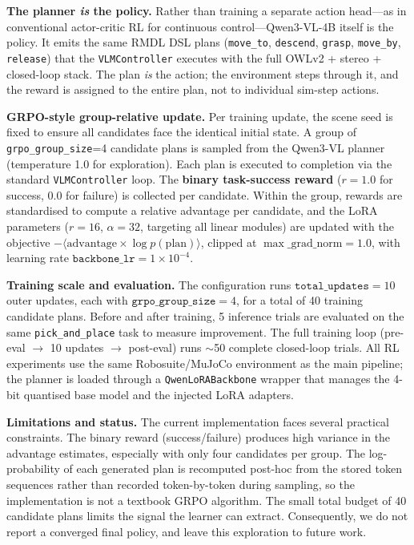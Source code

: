 \documentclass[conference]{IEEEtran}
\begin{document}
\textbf{The planner \emph{is} the policy.} Rather than training a separate action head---as in conventional actor-critic RL for continuous control---Qwen3-VL-4B itself is the policy. It emits the same RMDL DSL plans (\texttt{move\_to}, \texttt{descend}, \texttt{grasp}, \texttt{move\_by}, \texttt{release}) that the \texttt{VLMController} executes with the full OWLv2 + stereo + closed-loop stack. The plan \emph{is} the action; the environment steps through it, and the reward is assigned to the entire plan, not to individual sim-step actions.

\textbf{GRPO-style group-relative update.} Per training update, the scene seed is fixed to ensure all candidates face the identical initial state. A group of \texttt{grpo\_group\_size}=4 candidate plans is sampled from the Qwen3-VL planner (temperature 1.0 for exploration). Each plan is executed to completion via the standard \texttt{VLMController} loop. The \textbf{binary task-success reward} ($r=1.0$ for success, $0.0$ for failure) is collected per candidate. Within the group, rewards are standardised to compute a relative advantage per candidate, and the LoRA parameters ($r{=}16$, $\alpha{=}32$, targeting all linear modules) are updated with the objective $-\langle \text{advantage} \times \log p(\text{plan}) \rangle$, clipped at $\max\_\text{grad\_norm}=1.0$, with learning rate $\texttt{backbone\_lr}=1\times10^{-4}$.

\textbf{Training scale and evaluation.} The configuration runs $\texttt{total\_updates}=10$ outer updates, each with $\texttt{grpo\_group\_size}=4$, for a total of 40 training candidate plans. Before and after training, 5 inference trials are evaluated on the same \texttt{pick\_and\_place} task to measure improvement. The full training loop (pre-eval $\to$ 10 updates $\to$ post-eval) runs $\sim$50 complete closed-loop trials. All RL experiments use the same Robosuite/MuJoCo environment as the main pipeline; the planner is loaded through a \texttt{QwenLoRABackbone} wrapper that manages the 4-bit quantised base model and the injected LoRA adapters.

\textbf{Limitations and status.} The current implementation faces several practical constraints. The binary reward (success/failure) produces high variance in the advantage estimates, especially with only four candidates per group. The log-probability of each generated plan is recomputed post-hoc from the stored token sequences rather than recorded token-by-token during sampling, so the implementation is not a textbook GRPO algorithm. The small total budget of 40 candidate plans limits the signal the learner can extract. Consequently, %
we do not report a converged final policy, and leave this exploration to future work. %
\end{document}
